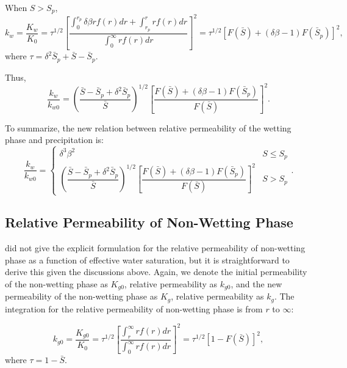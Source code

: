 \documentclass[preprint,12pt,authoryear]{elsarticle}
\begin{document}
When $S>S_p$,
\begin{equation}
k_w=\dfrac{K_w}{K_0}=\tau^{1/2}[\dfrac{\int_0^{r_p} \delta\beta rf(r)dr+\int_{r_p}^r rf(r)dr}{\int_0^{\infty} rf(r)dr}]^2=\tau^{1/2}[F(\bar{S})+(\delta\beta-1)F(\bar{S}_p)]^2,
\end{equation} 
where $\tau=\delta^2 \bar{S}_p + \bar{S}- \bar{S}_p$.

Thus,
\begin{equation}
\dfrac{k_w}{k_{w0}}=(\dfrac{\bar{S}-\bar{S}_p+\delta^2 \bar{S}_p}{\bar{S}})^{1/2}[\dfrac{F(\bar{S})+(\delta\beta-1)F(\bar{S}_p)}{F(\bar{S})}]^2.
\end{equation}

To summarize, the new relation between relative permeability of the wetting phase and precipitation is:
\begin{equation}
\label{eq:KrwPcp}
\dfrac{k_w}{k_{w0}}= \begin{cases}
\delta^3\beta^2 &S\leq S_p \\
(\dfrac{\bar{S}-\bar{S}_p+\delta^2 \bar{S}_p}{\bar{S}})^{1/2}[\dfrac{F(\bar{S})+(\delta\beta-1)F(\bar{S}_p)}{F(\bar{S})}]^2 & S>S_p
\end{cases}.
\end{equation}


\subsection{Relative Permeability of Non-Wetting Phase}

\cite{van1980closed} did not give the explicit formulation for the relative permeability of non-wetting phase as a function of effective water saturation, but it is straightforward to derive this given the discussions above. Again, we denote the initial permeability of the non-wetting phase as $K_{g0}$, relative permeability as $k_{g0}$, and the new permeability of the non-wetting phase as $K_g$, relative permeability as $k_g$. The integration for the relative permeability of non-wetting phase is from $r$ to $\infty$:



\begin{equation}
k_{g0}=\dfrac{K_{g0}}{K_0}=\tau^{1/2}[\dfrac{\int_r^\infty rf(r)dr}{\int_0^\infty rf(r)dr}]^2=\tau^{1/2}[1-F(\bar{S})]^2,
\end{equation} 
where $\tau=1-\bar{S}$.
\end{document}
